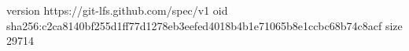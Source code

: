 version https://git-lfs.github.com/spec/v1
oid sha256:c2ca8140bf255d1ff77d1278eb3eefed4018b4b1e71065b8e1ccbc68b74c8acf
size 29714
